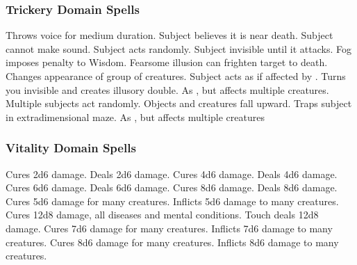 \subsubsection{Trickery Domain Spells}

\begin{spelllist}
  \spellhead[1]{}
   Throws voice for medium duration.
   Subject believes it is near death.
   Subject cannot make sound.
   Subject acts randomly.
   Subject invisible until it attacks.
   Fog imposes  penalty to Wisdom.
   Fearsome illusion can frighten target to death.
   Changes appearance of group of creatures.
   Subject acts as if affected by .
   Turns you invisible and creates illusory double.
  \spellhead[6]{}
   As , but affects multiple creatures.
   Multiple subjects act randomly.
  \spellhead[8]{}
   Objects and creatures fall upward.
   Traps subject in extradimensional maze.
   As , but affects multiple creatures
\end{spelllist}

\subsubsection{Vitality Domain Spells}

\begin{spelllist}
   Cures 2d6 damage.
   Deals 2d6 damage.
   Cures 4d6 damage.
   Deals 4d6 damage.
   Cures 6d6 damage.
   Deals 6d6 damage.
   Cures 8d6 damage.
   Deals 8d6 damage.
   Cures 5d6 damage for many creatures.
   Inflicts 5d6 damage to many creatures.
   Cures 12d8 damage, all diseases and mental conditions.
   Touch deals 12d8 damage.
   Cures 7d6 damage for many creatures.
   Inflicts 7d6 damage to many creatures.
   Cures 8d6 damage for many creatures.
   Inflicts 8d6 damage to many creatures.
  \spellhead[9]{}
  \spellhead[9]{}
\end{spelllist}

